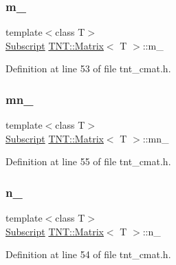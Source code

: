 \subsubsection{\texorpdfstring{m\+\_\+}{m\_}}
{\footnotesize\ttfamily template$<$class T$>$ \\
\hyperlink{namespaceTNT_af22e3f1460e145c04ce4e7d701e4c1c1}{Subscript} \hyperlink{classTNT_1_1Matrix}{T\+N\+T\+::\+Matrix}$<$ T $>$\+::m\+\_\+\hspace{0.3cm}{\ttfamily [protected]}}



Definition at line 53 of file tnt\+\_\+cmat.\+h.

\mbox{\label{classTNT_1_1Matrix_a1211bb821e4b22be124e16b1123f769c}} 
\subsubsection{\texorpdfstring{mn\+\_\+}{mn\_}}
{\footnotesize\ttfamily template$<$class T$>$ \\
\hyperlink{namespaceTNT_af22e3f1460e145c04ce4e7d701e4c1c1}{Subscript} \hyperlink{classTNT_1_1Matrix}{T\+N\+T\+::\+Matrix}$<$ T $>$\+::mn\+\_\+\hspace{0.3cm}{\ttfamily [protected]}}



Definition at line 55 of file tnt\+\_\+cmat.\+h.

\mbox{\label{classTNT_1_1Matrix_ab7dc73d05542cc97be2280a50ac1374c}} 
\subsubsection{\texorpdfstring{n\+\_\+}{n\_}}
{\footnotesize\ttfamily template$<$class T$>$ \\
\hyperlink{namespaceTNT_af22e3f1460e145c04ce4e7d701e4c1c1}{Subscript} \hyperlink{classTNT_1_1Matrix}{T\+N\+T\+::\+Matrix}$<$ T $>$\+::n\+\_\+\hspace{0.3cm}{\ttfamily [protected]}}



Definition at line 54 of file tnt\+\_\+cmat.\+h.


